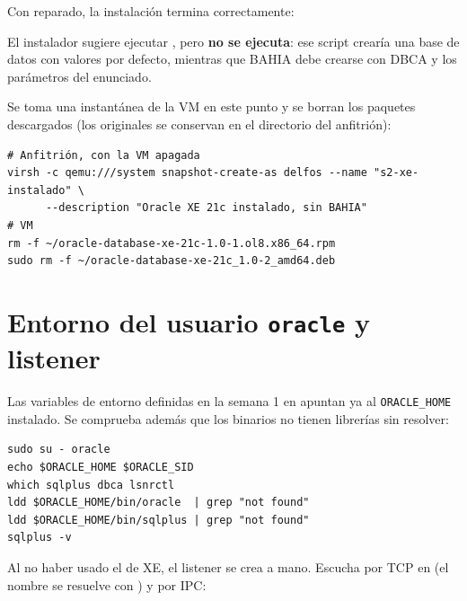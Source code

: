 Con  reparado, la instalación termina correctamente:


El instalador sugiere ejecutar , pero
\textbf{no se ejecuta}: ese script crearía una base de datos  con valores
por defecto, mientras que BAHIA debe crearse con DBCA y los parámetros del
enunciado.

Se toma una instantánea de la VM en este punto y se borran los paquetes
descargados (los originales se conservan en el directorio  del
anfitrión):

\begin{lstlisting}[style=bash]
# Anfitrión, con la VM apagada
virsh -c qemu:///system snapshot-create-as delfos --name "s2-xe-instalado" \
      --description "Oracle XE 21c instalado, sin BAHIA"
# VM
rm -f ~/oracle-database-xe-21c-1.0-1.ol8.x86_64.rpm
sudo rm -f ~/oracle-database-xe-21c_1.0-2_amd64.deb
\end{lstlisting}


\section{Entorno del usuario \texttt{oracle} y listener}
\label{sec:entorno}

Las variables de entorno definidas en la semana 1 en
 apuntan ya al \texttt{ORACLE\_HOME} instalado.
Se comprueba además que los binarios no tienen librerías sin resolver:

\begin{lstlisting}[style=bash]
sudo su - oracle
echo $ORACLE_HOME $ORACLE_SID
which sqlplus dbca lsnrctl
ldd $ORACLE_HOME/bin/oracle  | grep "not found"
ldd $ORACLE_HOME/bin/sqlplus | grep "not found"
sqlplus -v
\end{lstlisting}


Al no haber usado el  de XE, el listener se crea a mano. Escucha
por TCP en \cmd{delfos.inf:1521} (el nombre se resuelve con \cmd{/etc/hosts}) y
por IPC:


